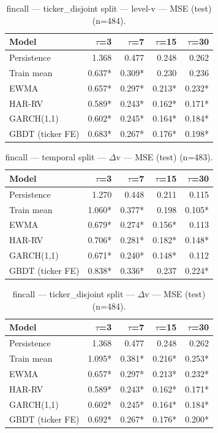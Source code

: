 \begin{table}[t]
\centering
\begin{tabular}{lrrrr}
\toprule
Model & $\tau$=3 & $\tau$=7 & $\tau$=15 & $\tau$=30 \\
\midrule
Persistence & 1.368 & 0.477 & 0.248 & 0.262 \\
Train mean & 0.637* & 0.309* & 0.230 & 0.236 \\
EWMA & 0.657* & 0.297* & 0.213* & 0.232* \\
HAR-RV & 0.589* & 0.243* & 0.162* & 0.171* \\
GARCH(1,1) & 0.602* & 0.245* & 0.164* & 0.184* \\
GBDT (ticker FE) & 0.683* & 0.267* & 0.176* & 0.198* \\
\bottomrule
\end{tabular}
\caption{fincall — ticker\_disjoint split — level-v — MSE (test) (n=484).}
\end{table}

\begin{table}[t]
\centering
\begin{tabular}{lrrrr}
\toprule
Model & $\tau$=3 & $\tau$=7 & $\tau$=15 & $\tau$=30 \\
\midrule
Persistence & 1.270 & 0.448 & 0.211 & 0.115 \\
Train mean & 1.060* & 0.377* & 0.198 & 0.105* \\
EWMA & 0.679* & 0.274* & 0.156* & 0.113 \\
HAR-RV & 0.706* & 0.281* & 0.182* & 0.148* \\
GARCH(1,1) & 0.671* & 0.240* & 0.148* & 0.112 \\
GBDT (ticker FE) & 0.838* & 0.336* & 0.237 & 0.224* \\
\bottomrule
\end{tabular}
\caption{fincall — temporal split — $\Delta$v — MSE (test) (n=483).}
\end{table}

\begin{table}[t]
\centering
\begin{tabular}{lrrrr}
\toprule
Model & $\tau$=3 & $\tau$=7 & $\tau$=15 & $\tau$=30 \\
\midrule
Persistence & 1.368 & 0.477 & 0.248 & 0.262 \\
Train mean & 1.095* & 0.381* & 0.216* & 0.253* \\
EWMA & 0.657* & 0.297* & 0.213* & 0.232* \\
HAR-RV & 0.589* & 0.243* & 0.162* & 0.171* \\
GARCH(1,1) & 0.602* & 0.245* & 0.164* & 0.184* \\
GBDT (ticker FE) & 0.692* & 0.267* & 0.176* & 0.200* \\
\bottomrule
\end{tabular}
\caption{fincall — ticker\_disjoint split — $\Delta$v — MSE (test) (n=484).}
\end{table}

